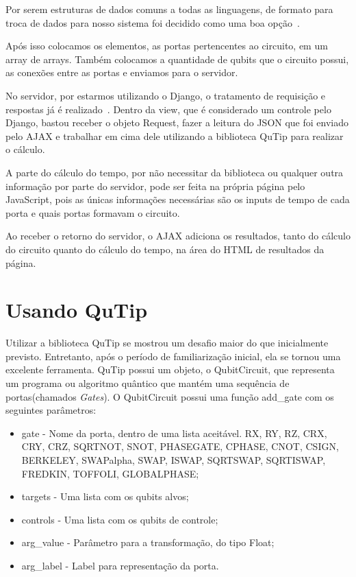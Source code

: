 \documentclass[a4paper, 12pt, oneside]{book}
\begin{document}
Por serem estruturas de dados comuns a todas as linguagens, de formato para troca de dados para nosso sistema foi decidido como uma boa opção~\cite{json}.

Após isso colocamos os elementos, as portas pertencentes ao circuito, em um array de arrays. Também colocamos a quantidade de qubits que o circuito possui, as conexões entre as portas e enviamos para o servidor.

No servidor, por estarmos utilizando o Django, o tratamento de requisição e respostas já é realizado~\cite{django-req-resp}. Dentro da view, que é considerado um controle pelo Django, bastou receber o objeto Request, fazer a leitura do JSON que foi enviado pelo AJAX e trabalhar em cima dele utilizando a biblioteca QuTip para realizar o cálculo.

A parte do cálculo do tempo, por não necessitar da biblioteca ou qualquer outra informação por parte do servidor, pode ser feita na própria página pelo JavaScript, pois as únicas informações necessárias são os inputs de tempo de cada porta e quais portas formavam o circuito.

Ao receber o retorno do servidor, o AJAX adiciona os resultados, tanto do cálculo do circuito quanto do cálculo do tempo, na área do HTML de resultados da página.

\section{Usando QuTip}

Utilizar a biblioteca QuTip se mostrou um desafio maior do que inicialmente previsto. Entretanto, após o período de familiarização inicial, ela se tornou uma excelente ferramenta. QuTip possui um objeto, o QubitCircuit, que representa um programa ou algoritmo quântico que mantém uma sequência de portas(chamados \textit{Gates}). O QubitCircuit possui uma função add\_gate com os seguintes parâmetros:
\begin{itemize}
\item gate - Nome da porta, dentro de uma lista aceitável. RX, RY, RZ, CRX, CRY, CRZ, SQRTNOT, SNOT, PHASEGATE, CPHASE, CNOT, CSIGN, BERKELEY, SWAPalpha, SWAP, ISWAP, SQRTSWAP, SQRTISWAP, FREDKIN, TOFFOLI, GLOBALPHASE;
\item targets - Uma lista com os qubits alvos;
\item controls - Uma lista com os qubits de controle;
\item arg\_value - Parâmetro para a transformação, do tipo Float;
\item arg\_label - Label para representação da porta.
\end{itemize}
\end{document}
